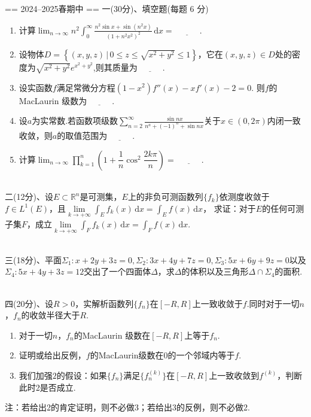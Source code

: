 == 2024--2025春期中 ==
一(30分)、填空题(每题 6 分)
\begin{enumerate}[label=(\arabic*)]
\item 计算$\displaystyle\lim_{n\to \infty}n^2\int_0^{\infty}\frac{n^2\sin x+\sin(n^2x)}{(1+n^2x^2)^2}\,\mathrm{d}x=\underline{\qquad\quad}$.
\item 设物体$D=\left\{ (x,y,z) \,\big|\, 0 \le z\le \sqrt{x^2+y^2} \le 1\right\}$，它在$(x,y,z)\in D$处的密度为$\sqrt{x^2+y^2}e^{x^2+y^2}$,则其质量为$\underline{\qquad\quad}$.
\item 设实函数$f$满足常微分方程$(1-x^2)f''(x)-xf'(x)-2=0$. 则$f$的MacLaurin 级数为$\underline{\qquad\quad}$.
\item 设$a$为实常数.若函数项级数$\displaystyle\sum_{n=2}^{\infty}\frac{\sin nx}{n^{a}+(-1)^n+\sin nx}$关于$x\in (0,2\pi)$内闭一致收敛，则$a$的取值范围为$\underline{\quad\qquad}$.
\item 计算$\displaystyle\lim_{n\to \infty}\prod_{k=1}^n\left(1+\dfrac{1}{n}\cos^2 \dfrac{2k\pi}{n}\right)=\underline{\quad\qquad}$.
\end{enumerate}
~\\
二(12分)、设$E\subset \mathbb{R}^n$是可测集，$E$上的非负可测函数列$\{f_k\}$依测度收敛于$f\in L^1(E)$，且$\lim\limits_{k\to +\infty}\int_{E}f_k(x)\,\mathrm{d}x=\int_Ef(x)\,\mathrm{d}x$，
求证：对于$E$的任何可测子集$F$，成立$\lim\limits_{k\to +\infty}\int_{F}f_k(x)\,\mathrm{d}x=\int_Ff(x)\,\mathrm{d}x$.

~\\
三(18分)、平面$\Sigma_1:x+2y+3z=0,\Sigma_2:3x+4y+7z=0,\Sigma_3:5x+6y+9z=0$以及$\Sigma_4:5x+4y+3z=12$交出了一个四面体$\Delta$，求$\Delta$的体积以及三角形$\Delta \cap \Sigma_4$的面积.

~\\
四(20分)、设$R>0$，实解析函数列$\{f_n\}$在$[-R,R]$上一致收敛于$f$.同时对于一切$n$，$f_n$的收敛半径大于$R$.
\begin{enumerate}
    \item 对于一切$n$，$f_n$的MacLaurin 级数在$[-R,R]$上等于$f_n$.
    \item 证明或给出反例，$f$的MacLaurin级数在$0$的一个邻域内等于$f$.
    \item 我们加强$2$的假设：如果$\{f_n\}$满足$\{f_n^{(k)}\}$在$[-R,R]$上一致收敛到$f^{(k)}$，判断此时2是否成立.
\end{enumerate}
注：若给出2的肯定证明，则不必做3；若给出3的反例，则不必做2.

